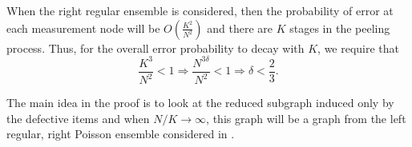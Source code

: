 \documentclass[journal,draft,onecolumn]{IEEEtran}
\begin{document}
When the right regular ensemble is considered, then the probability of error at each measurement node will be $O\left(\frac{K^2}{N^2}\right)$ and there are $K$ stages in the peeling process. Thus, for the overall error probability to decay with $K$, we require that
\[
\frac{K^3}{N^2} < 1 \Rightarrow \frac{N^{3\delta}}{N^2} < 1 \Rightarrow \delta < \frac{2}{3}.
\]

The main idea in the proof is to look at the reduced subgraph induced only by the defective items and when $N/K \rightarrow \infty$, this graph will be a graph from the left regular, right Poisson ensemble considered in \cite{lee2015saffron}.


\end{document}
